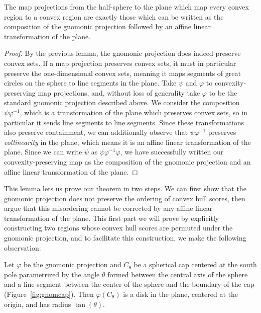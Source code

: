 \begin{lemma}
  The map projections from the half-sphere to the plane which map
  every convex region to a convex region are exactly those which can
  be written as the composition of the gnomonic projection followed by
  an affine linear transformation of the plane.
\end{lemma}

\begin{proof}
  By the previous lemma, the gnomonic projection does indeed preserve
  convex sets.   If a map projection preserves convex sets, it must in
  particular preserve the one-dimensional convex sets, meaning it maps
  segments of great circles on the sphere to line segments in the
  plane.  Take $\psi$ and $\varphi$ to convexity-preserving map
  projections, and, without loss of generality take $\varphi$ to be
  the standard gnomonic projection described above. We consider the
  composition $\psi\varphi^{-1}$, which is a transformation of the
  plane which preserves convex sets, so in particular it sends line
  segments to line segments.  Since these transformations also
  preserve containment, we can additionally observe that
  $\psi\varphi^{-1}$ preserves \textit{collinearity} in the plane,
  which means it is an affine linear transformation of the plane.
  Since we can write $\psi$ as $\psi\varphi^{-1}\varphi$, we have
  successfully written our convexity-preserving map as the composition
  of the gnomonic projection and an affine linear transformation of
  the plane.
\end{proof}

This lemma lets us prove our theorem in two steps.  We can first show
that the gnomonic projection does not preserve the ordering of convex
hull scores, then argue that this misordering cannot be corrected by
any affine linear transformation of the plane.  This first part we
will prove by explicitly constructing two regions whose convex hull
scores are permuted under the gnomonic projection, and to facilitate
this construction, we make the following observation:

\begin{lemma}
Let $\varphi$ be the gnomonic projection and $C_\theta$ be a spherical
cap centered at the south pole parametrized by the angle $\theta$
formed between the central axis of the sphere and a line segment
between the center of the sphere and the boundary of the cap
(Figure~\ref{fig:gnomcap}).  Then $\varphi(C_\theta)$ is a disk in the
plane, centered at the origin, and has radius $\tan(\theta)$.
\end{lemma}

